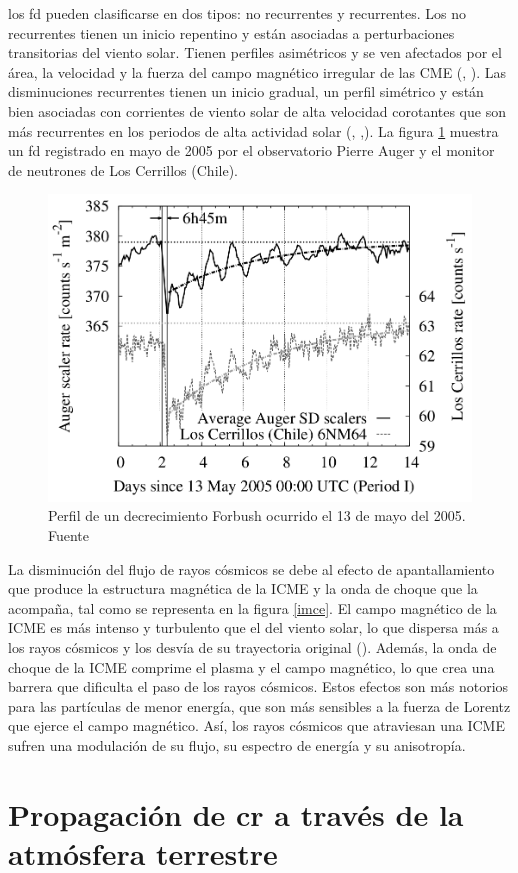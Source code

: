  los \gls{fd} pueden clasificarse en dos tipos: no recurrentes y recurrentes. Los no recurrentes tienen un inicio repentino y están asociadas a perturbaciones transitorias del viento solar. Tienen perfiles asimétricos y se ven afectados por el área, la velocidad y la fuerza del campo magnético irregular de las CME (\cite{cane2000}, \cite{lingri_2016}). Las disminuciones recurrentes tienen un inicio gradual, un perfil simétrico y están bien asociadas con corrientes de viento solar de alta velocidad corotantes que son más recurrentes en los periodos de alta actividad solar (\cite{lingri_2016}, \cite{kallaya_2021},\cite{wang_2023}). La figura \ref{forbush}  muestra un \gls{fd} registrado en mayo de 2005 por el observatorio Pierre Auger y el monitor de neutrones de Los Cerrillos (Chile). 
\begin{figure}[H]
    \centering
    \includegraphics[width=0.6\linewidth]{Figs/mauro_forbush.png}
    \caption{Perfil de un decrecimiento Forbush ocurrido el 13 de mayo del 2005. Fuente \cite{asorey}}
    \label{forbush}
\end{figure}
La disminución del flujo de rayos cósmicos se debe al efecto de apantallamiento que produce la estructura magnética de la ICME y la onda de choque que la acompaña, tal como se representa en la figura \ref{imce}. El campo magnético de la ICME es más intenso y turbulento que el del viento solar, lo que dispersa más a los rayos cósmicos y los desvía de su trayectoria original (\cite{belov_2009}). Además, la onda de choque de la ICME comprime el plasma y el campo magnético, lo que crea una barrera que dificulta el paso de los rayos cósmicos. Estos efectos son más notorios para las partículas de menor energía, que son más sensibles a la fuerza de Lorentz que ejerce el campo magnético. Así, los rayos cósmicos que atraviesan una ICME sufren una modulación de su flujo, su espectro de energía y su anisotropía.

\section{Propagación de \gls{cr} a través de la atmósfera terrestre}

